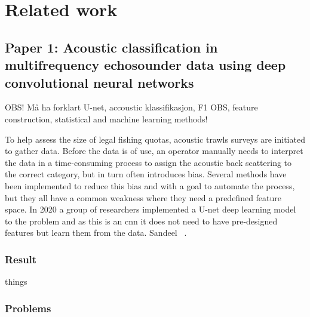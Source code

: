 \chapter{Related work}



\section{Paper 1: Acoustic classification in multifrequency echosounder data using deep convolutional neural networks} \label{unet_paper_acoustic}
    
    
    OBS! Må ha forklart U-net, accoustic klassifikasjon, F1 OBS, feature construction, statistical and machine learning methods!
    
    To help assess the size of legal fishing quotas, acoustic trawls surveys are initiated to gather data. Before the data is of use, an operator manually needs to interpret the data in a time-consuming process to assign the acoustic back scattering to the correct category, but in turn often introduces bias. Several methods have been implemented to reduce this bias and with a goal to automate the process, but they all have a common weakness where they need a predefined feature space.  In 2020 a group of researchers implemented a U-net deep learning model to the problem and as this is an \gls{cnn} it does not need to have pre-designed features but learn them from the data. Sandeel  ~\cite{brautaset2020acoustic}. 
    
    
    
    \subsection{Result}
        things
    \subsection{Problems}